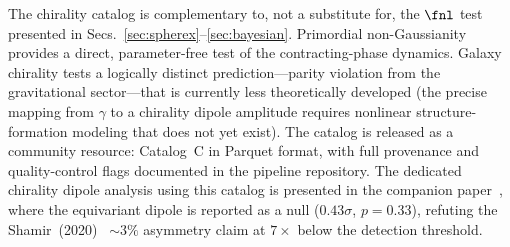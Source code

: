 The chirality catalog is complementary to, not a substitute for, the
$\fnl$ test presented in Secs.~\ref{sec:spherex}--\ref{sec:bayesian}.
Primordial non-Gaussianity provides a direct, parameter-free test of
the contracting-phase dynamics.  Galaxy chirality tests a logically
distinct prediction---parity violation from the gravitational
sector---that is currently less theoretically developed (the precise
mapping from $\gamma$ to a chirality dipole amplitude requires
nonlinear structure-formation modeling that does not yet exist).  The
catalog is released as a community resource: Catalog~C in Parquet
format, with full provenance and quality-control flags documented in
the pipeline repository.  The dedicated chirality dipole analysis
using this catalog is presented in the companion
paper~\citep{Golden:2026chirality}, where the equivariant dipole is
reported as a null ($0.43\sigma$, $p=0.33$), refuting the
Shamir~(2020)~\cite{Shamir2020} $\sim 3\%$ asymmetry claim at
$7\times$ below the detection threshold.
